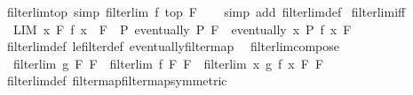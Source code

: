 \begin{isabellebody}
\isanewline
{}\isamarkupfalse%
\ filterlim{\isacharunderscore}{\kern0pt}top\ {\isacharbrackleft}{\kern0pt}simp{\isacharbrackright}{\kern0pt}{\isacharcolon}{\kern0pt}\ {\isachardoublequoteopen}filterlim\ f\ top\ F{\isachardoublequoteclose}\isanewline
%
\isadelimproof
\ \ %
\endisadelimproof
%
\isatagproof
{}\isamarkupfalse%
\ {\isacharparenleft}{\kern0pt}simp\ add{\isacharcolon}{\kern0pt}\ filterlim{\isacharunderscore}{\kern0pt}def{\isacharparenright}{\kern0pt}%
\endisatagproof
{\isafoldproof}%
%
\isadelimproof
\isanewline
%
\endisadelimproof
\isanewline
{}\isamarkupfalse%
\ filterlim{\isacharunderscore}{\kern0pt}iff{\isacharcolon}{\kern0pt}\isanewline
\ \ {\isachardoublequoteopen}{\isacharparenleft}{\kern0pt}LIM\ x\ F{}{\isachardot}{\kern0pt}\ f\ x\ {\isacharcolon}{\kern0pt}{\isachargreater}{\kern0pt}\ F{}{\isacharparenright}{\kern0pt}\ {\isasymlongleftrightarrow}\ {\isacharparenleft}{\kern0pt}{\isasymforall}P{\isachardot}{\kern0pt}\ eventually\ P\ F{}\ {\isasymlongrightarrow}\ eventually\ {\isacharparenleft}{\kern0pt}{\isasymlambda}x{\isachardot}{\kern0pt}\ P\ {\isacharparenleft}{\kern0pt}f\ x{\isacharparenright}{\kern0pt}{\isacharparenright}{\kern0pt}\ F{}{\isacharparenright}{\kern0pt}{\isachardoublequoteclose}\isanewline
%
\isadelimproof
\ \ %
\endisadelimproof
%
\isatagproof
{}\isamarkupfalse%
\ filterlim{\isacharunderscore}{\kern0pt}def\ le{\isacharunderscore}{\kern0pt}filter{\isacharunderscore}{\kern0pt}def\ eventually{\isacharunderscore}{\kern0pt}filtermap\ \isacommand{{\isachardot}{\kern0pt}{\isachardot}{\kern0pt}}\isamarkupfalse%
%
\endisatagproof
{\isafoldproof}%
%
\isadelimproof
\isanewline
%
\endisadelimproof
\isanewline
{}\isamarkupfalse%
\ filterlim{\isacharunderscore}{\kern0pt}compose{\isacharcolon}{\kern0pt}\isanewline
\ \ {\isachardoublequoteopen}filterlim\ g\ F{}\ F{}\ {\isasymLongrightarrow}\ filterlim\ f\ F{}\ F{}\ {\isasymLongrightarrow}\ filterlim\ {\isacharparenleft}{\kern0pt}{\isasymlambda}x{\isachardot}{\kern0pt}\ g\ {\isacharparenleft}{\kern0pt}f\ x{\isacharparenright}{\kern0pt}{\isacharparenright}{\kern0pt}\ F{}\ F{}{\isachardoublequoteclose}\isanewline
%
\isadelimproof
\ \ %
\endisadelimproof
%
\isatagproof
{}\isamarkupfalse%
\ filterlim{\isacharunderscore}{\kern0pt}def\ filtermap{\isacharunderscore}{\kern0pt}filtermap{\isacharbrackleft}{\kern0pt}symmetric{\isacharbrackright}{\kern0pt}\ \isamarkupfalse%

\end{isabellebody}

